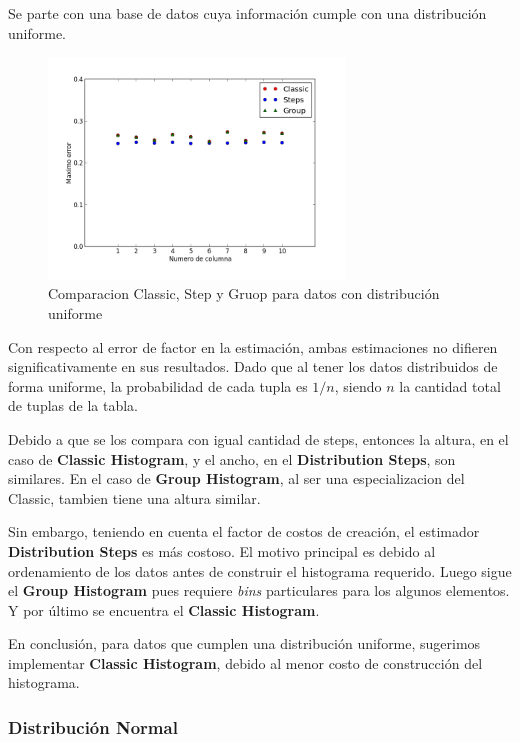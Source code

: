 \documentclass[10pt, a4paper,english,spanish,hidelinks]{article}
\begin{document}
{{Se parte con una base de datos cuya información cumple con una distribución uniforme.

\begin{figure}[h!]
  \centering
  \includegraphics[width=0.7\textwidth]{./imagenes/ejb3_uniforme.png}
  \caption{Comparacion Classic, Step y Gruop para datos con distribución uniforme}
\end{figure}

\newpage
Con respecto al error de factor en la estimación, ambas estimaciones no difieren
significativamente en sus resultados. Dado que al tener los datos distribuidos de forma
uniforme, la probabilidad de cada tupla es $1/n$, siendo $n$ la cantidad total de tuplas de la tabla.

Debido a que se los compara con igual cantidad de steps, entonces la altura, en el caso de
\textbf{Classic Histogram}, y el ancho, en el \textbf{Distribution Steps}, son similares.
En el caso de \textbf{Group Histogram}, al ser una especializacion del Classic, tambien tiene
una altura similar.

Sin embargo, teniendo en cuenta el factor de costos de creación, el estimador
\textbf{Distribution Steps} es más costoso. El motivo principal es debido al ordenamiento
de los datos antes de construir el histograma requerido. Luego sigue el \textbf{Group Histogram}
pues requiere \textit{bins} particulares para los algunos elementos. Y por último se encuentra el \textbf{Classic Histogram}.

En conclusión, para datos que cumplen una distribución uniforme, sugerimos implementar
\textbf{Classic Histogram}, debido al menor costo de construcción del histograma.


\subsubsection{Distribución Normal}

}}
\end{document}
